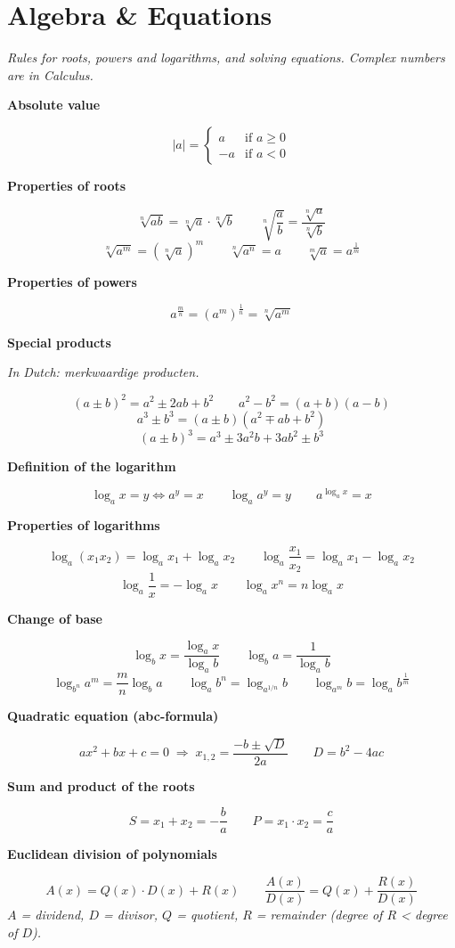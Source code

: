 \documentclass[11pt]{article}
\newcommand{\sect}[2]{\section*{\color{#1}#2}}       %
\newcommand{\sub}[1]{\par\medskip\textbf{#1}\par}     %
\newcommand{\expl}[1]{{\color{gray}\itshape #1}\par}  %
\begin{document}
\sect{cAlg}{Algebra \& Equations}
\expl{Rules for roots, powers and logarithms, and solving equations. Complex numbers are in Calculus.}

\sub{Absolute value}
\[ |a| = \begin{cases} a & \text{if } a \ge 0 \\ -a & \text{if } a < 0 \end{cases} \]

\sub{Properties of roots}
\[ \sqrt[n]{ab} = \sqrt[n]{a}\cdot\sqrt[n]{b} \qquad \sqrt[n]{\frac{a}{b}} = \frac{\sqrt[n]{a}}{\sqrt[n]{b}} \]
\[ \sqrt[n]{a^m} = \left(\sqrt[n]{a}\right)^m \qquad \sqrt[n]{a^n} = a \qquad \sqrt[m]{a} = a^{\frac{1}{m}} \]

\sub{Properties of powers}
\[ a^{\frac{m}{n}} = \left(a^m\right)^{\frac{1}{n}} = \sqrt[n]{a^m} \]

\sub{Special products}
\expl{In Dutch: merkwaardige producten.}
\[ (a \pm b)^2 = a^2 \pm 2ab + b^2 \qquad a^2 - b^2 = (a+b)(a-b) \]
\[ a^3 \pm b^3 = (a \pm b)\left(a^2 \mp ab + b^2\right) \]
\[ (a \pm b)^3 = a^3 \pm 3a^2b + 3ab^2 \pm b^3 \]

\sub{Definition of the logarithm}
\[ \log_a x = y \iff a^y = x \qquad \log_a a^y = y \qquad a^{\log_a x} = x \]

\sub{Properties of logarithms}
\[ \log_a (x_1 x_2) = \log_a x_1 + \log_a x_2 \qquad \log_a \frac{x_1}{x_2} = \log_a x_1 - \log_a x_2 \]
\[ \log_a \frac{1}{x} = -\log_a x \qquad \log_a x^n = n \log_a x \]

\sub{Change of base}
\[ \log_b x = \frac{\log_a x}{\log_a b} \qquad \log_b a = \frac{1}{\log_a b} \]
\[ \log_{b^n} a^m = \frac{m}{n}\log_b a \qquad \log_a b^n = \log_{a^{1/n}} b \qquad \log_{a^m} b = \log_a b^{\frac{1}{m}} \]

\sub{Quadratic equation (abc-formula)}
\[ ax^2 + bx + c = 0 \;\Rightarrow\; x_{1,2} = \frac{-b \pm \sqrt{D}}{2a} \qquad D = b^2 - 4ac \]

\sub{Sum and product of the roots}
\[ S = x_1 + x_2 = -\frac{b}{a} \qquad P = x_1 \cdot x_2 = \frac{c}{a} \]

\sub{Euclidean division of polynomials}
\[ A(x) = Q(x)\cdot D(x) + R(x) \qquad \frac{A(x)}{D(x)} = Q(x) + \frac{R(x)}{D(x)} \]
\expl{$A$ = dividend, $D$ = divisor, $Q$ = quotient, $R$ = remainder (degree of $R$ < degree of $D$).}
\end{document}
